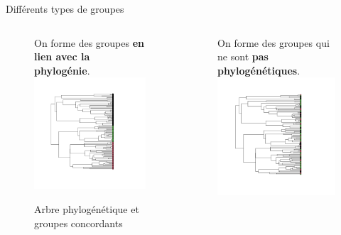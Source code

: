 \documentclass[10pt]{beamer}\usepackage[]{graphicx}\usepackage[]{xcolor}
\begin{document}
\begin{frame}{Différents types de groupes}
\begin{columns}
    \begin{column}{0.5\textwidth}
        \begin{figure}
        \centering
    On forme des groupes \textbf{en lien avec la phylogénie}.
        \includegraphics[scale=0.32]{img/group_phylo_tree.png}
        \caption{Arbre phylogénétique et groupes concordants}
        \label{fig:phylo_matching}
    \end{figure}
    \end{column}
    \begin{column}{0.5\textwidth}
        \begin{figure}
            \centering
    On forme des groupes qui ne sont \textbf{pas phylogénétiques}.
            \includegraphics[scale=0.32]{img/group_nonphylo_tree.png}

\end{figure}
\end{column}
\end{columns}
\end{frame}
\end{document}
